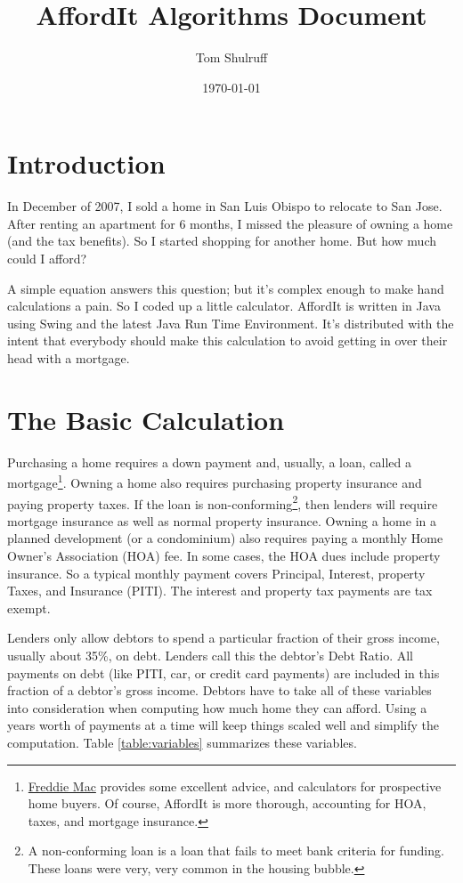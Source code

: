 \documentclass{article}
\title{AffordIt Algorithms Document}
\author{Tom Shulruff}
\date{\today}
\begin{document}
\maketitle

\section{Introduction}

In December of 2007, I sold a home in San Luis Obispo to relocate
to San Jose.  After renting an apartment for 6 months, I missed
the pleasure of owning a home (and the tax benefits).  So I started
shopping for another home.  But how much could I afford?

A simple equation answers this question; but it's complex
enough to make hand calculations a pain.  So I coded up a little
calculator. AffordIt is written in Java using Swing and the latest
 Java Run Time
Environment.  It's distributed with the intent that everybody 
should make this calculation to avoid getting in over their head with
a mortgage.

\section{The Basic Calculation}

Purchasing a home requires a down payment and, usually, a loan,
called a mortgage\footnote{
\href{http://www.freddiemac.com/corporate/buying_and_owning.html}{Freddie Mac} 
provides some excellent advice, and calculators  for
 prospective home buyers.
Of course, AffordIt is more thorough, accounting for HOA, taxes, and mortgage
 insurance.}.
Owning a home also requires purchasing property insurance 
and paying property taxes.  
If the loan is non-conforming\footnote{
A non-conforming loan is a loan that fails to meet bank criteria for 
funding.
These loans were very, very common in the housing bubble.},
then lenders will require mortgage insurance as well as normal
property insurance.
Owning a home
in a planned development (or a condominium) also requires paying
a monthly Home Owner's Association (HOA) fee. In some cases, the HOA 
dues include
property insurance.
So a typical monthly payment covers 
Principal, Interest, property Taxes, and Insurance (PITI).  
The interest and property tax payments are tax exempt.  

Lenders only allow debtors to spend a particular fraction of their
 gross income, usually about 35\%, on debt.
Lenders call this the debtor's Debt Ratio. All 
payments on debt (like PITI, car, or credit card payments) are
included in this fraction of a debtor's gross income.
Debtors have to take all of these variables into consideration when 
computing how much
 home they can afford. 
Using a years worth of 
payments at a time will keep things scaled well and simplify the 
computation.
Table \ref{table:variables} summarizes these variables.
\end{document}
